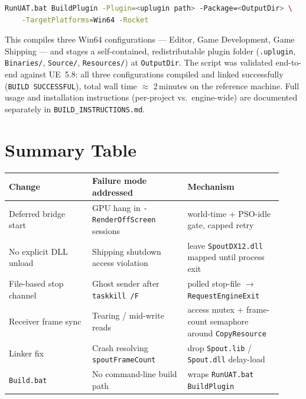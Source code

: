 \documentclass[11pt,a4paper]{article}
\begin{document}
\begin{lstlisting}[language=bash]
RunUAT.bat BuildPlugin -Plugin=<uplugin path> -Package=<OutputDir> \
    -TargetPlatforms=Win64 -Rocket
\end{lstlisting}

This compiles three Win64 configurations --- Editor, Game Development, Game
Shipping --- and stages a self-contained, redistributable plugin folder
(\texttt{.uplugin}, \texttt{Binaries/}, \texttt{Source/},
\texttt{Resources/}) at \texttt{OutputDir}. The script was validated
end-to-end against UE~5.8: all three configurations compiled and linked
successfully (\texttt{BUILD SUCCESSFUL}), total wall time $\approx$
2\,minutes on the reference machine. Full usage and installation
instructions (per-project vs.\ engine-wide) are documented separately in
\texttt{BUILD\_INSTRUCTIONS.md}.

\section{Summary Table}

\begin{center}
\begin{tabular}{@{}p{0.28\linewidth}p{0.32\linewidth}p{0.32\linewidth}@{}}
\toprule
Change & Failure mode addressed & Mechanism \\
\midrule
Deferred bridge start & GPU hang in
    \texttt{-RenderOffScreen} sessions & world-time + PSO-idle gate,
    capped retry \\
No explicit DLL unload & Shipping shutdown access violation &
    leave \texttt{SpoutDX12.dll} mapped until process exit \\
File-based stop channel & Ghost sender after \texttt{taskkill /F} &
    polled stop-file $\rightarrow$ \texttt{RequestEngineExit} \\
Receiver frame sync & Tearing / mid-write reads & access mutex +
    frame-count semaphore around \texttt{CopyResource} \\
Linker fix & Crash resolving
    \texttt{spoutFrameCount} & drop \texttt{Spout.lib} /
    \texttt{Spout.dll} delay-load \\
\texttt{Build.bat} & No command-line build path & wraps
    \texttt{RunUAT.bat BuildPlugin} \\
\bottomrule
\end{tabular}
\end{center}
\end{document}

